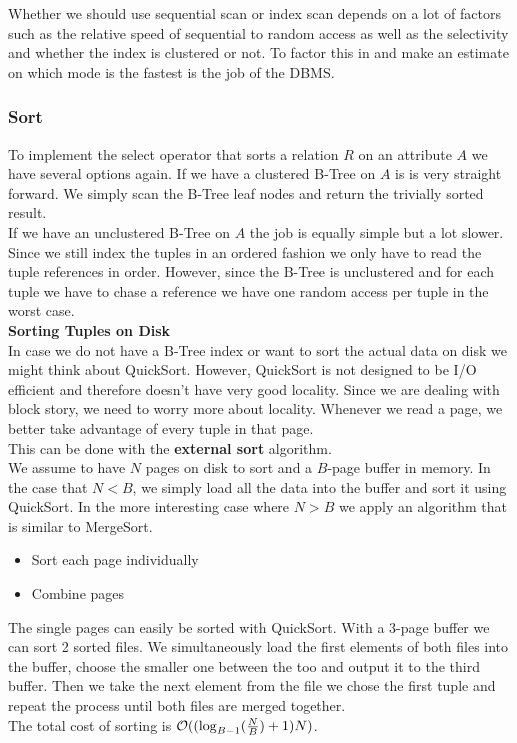 Whether we should use sequential scan or index scan depends on a lot of factors such as the relative speed of sequential to random access as well as the selectivity and whether the index is clustered or not. To factor this in and make an estimate on which mode is the fastest is the job of the DBMS.

\subsubsection{Sort}
To implement the select operator that sorts a relation $R$ on an attribute $A$ we have several options again. If we have a clustered B-Tree on $A$ is is very straight forward. We simply scan the B-Tree leaf nodes and return the trivially sorted result.\\
If we have an unclustered B-Tree on $A$ the job is equally simple but a lot slower. Since we still index the tuples in an ordered fashion we only have to read the tuple references in order. However, since the B-Tree is unclustered and for each tuple we have to chase a reference we have one random access per tuple in the worst case.\vspace{.3cm}\\
\textbf{Sorting Tuples on Disk}\\
In case we do not have a B-Tree index or want to sort the actual data on disk we might think about QuickSort. However, QuickSort is not designed to be I/O efficient and therefore doesn't have very good locality. Since we are dealing with block story, we need to worry more about locality. Whenever we read a page, we better take advantage of every tuple in that page.\\
This can be done with the \textbf{external sort} algorithm.\\
We assume to have $N$ pages on disk to sort and a $B$-page buffer in memory. In the case that $N < B$, we simply load all the data into the buffer and sort it using QuickSort. In the more interesting case where $N > B$ we apply an algorithm that is similar to MergeSort.
\begin{itemize}
\item Sort each page individually
\item Combine pages
\end{itemize}
The single pages can easily be sorted with QuickSort. With a 3-page buffer we can sort 2 sorted files. We simultaneously load the first elements of both files into the buffer, choose the smaller one between the too and output it to the third buffer. Then we take the next element from the file we chose the first tuple and repeat the process until both files are merged together.\\
The total cost of sorting is $\mathcal{O} (( \log_{B-1} (\frac{N}{B}) + 1) N )$.

